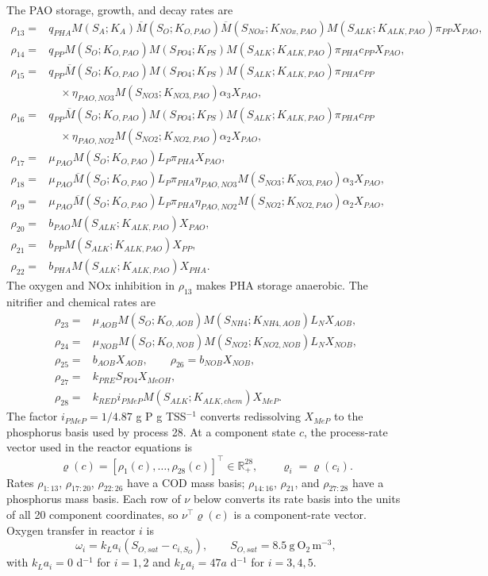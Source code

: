 \documentclass[a4paper,fleqn]{cas-sc}
\newcommand{\R}{\mathbb{R}}
\begin{document}
The PAO storage, growth, and decay rates are
\begin{align}
\rho_{13}={}&q_{PHA}M(S_A;K_A)\overline M(S_O;K_{O,PAO})\overline M(S_{NOx};K_{NOx,PAO})M(S_{ALK};K_{ALK,PAO})\pi_{PP}X_{PAO},\\
\rho_{14}={}&q_{PP}M(S_O;K_{O,PAO})M(S_{PO4};K_{PS})M(S_{ALK};K_{ALK,PAO})\pi_{PHA}c_{PP}X_{PAO},\\
\rho_{15}={}&q_{PP}\overline M(S_O;K_{O,PAO})M(S_{PO4};K_{PS})M(S_{ALK};K_{ALK,PAO})\pi_{PHA}c_{PP}\\
&\quad\times\eta_{PAO,NO3}M(S_{NO3};K_{NO3,PAO})\alpha_3X_{PAO},\\
\rho_{16}={}&q_{PP}\overline M(S_O;K_{O,PAO})M(S_{PO4};K_{PS})M(S_{ALK};K_{ALK,PAO})\pi_{PHA}c_{PP}\\
&\quad\times\eta_{PAO,NO2}M(S_{NO2};K_{NO2,PAO})\alpha_2X_{PAO},\\
\rho_{17}={}&\mu_{PAO}M(S_O;K_{O,PAO})L_P\pi_{PHA}X_{PAO},\\
\rho_{18}={}&\mu_{PAO}\overline M(S_O;K_{O,PAO})L_P\pi_{PHA}\eta_{PAO,NO3}M(S_{NO3};K_{NO3,PAO})\alpha_3X_{PAO},\\
\rho_{19}={}&\mu_{PAO}\overline M(S_O;K_{O,PAO})L_P\pi_{PHA}\eta_{PAO,NO2}M(S_{NO2};K_{NO2,PAO})\alpha_2X_{PAO},\\
\rho_{20}={}&b_{PAO}M(S_{ALK};K_{ALK,PAO})X_{PAO},\\
\rho_{21}={}&b_{PP}M(S_{ALK};K_{ALK,PAO})X_{PP},\\
\rho_{22}={}&b_{PHA}M(S_{ALK};K_{ALK,PAO})X_{PHA}.
\end{align}
The oxygen and NOx inhibition in $\rho_{13}$ makes PHA storage anaerobic. The nitrifier and chemical rates are
\begin{align}
\rho_{23}={}&\mu_{AOB}M(S_O;K_{O,AOB})M(S_{NH4};K_{NH4,AOB})L_NX_{AOB},\\
\rho_{24}={}&\mu_{NOB}M(S_O;K_{O,NOB})M(S_{NO2};K_{NO2,NOB})L_NX_{NOB},\\
\rho_{25}={}&b_{AOB}X_{AOB},\qquad \rho_{26}=b_{NOB}X_{NOB},\\
\rho_{27}={}&k_{PRE}S_{PO4}X_{MeOH},\\
\rho_{28}={}&k_{RED}i_{PMeP}M(S_{ALK};K_{ALK,chem})X_{MeP}.
\end{align}
The factor $i_{PMeP}=1/4.87$ g P g TSS$^{-1}$ converts redissolving $X_{MeP}$ to the phosphorus basis used by process 28. At a component state $c$, the process-rate vector used in the reactor equations is
\begin{equation}
\varrho(c)=[\rho_1(c),\ldots,\rho_{28}(c)]^\top\in\R_+^{28},
\qquad \varrho_i=\varrho(c_i).
\end{equation}
Rates $\rho_{1:13}$, $\rho_{17:20}$, $\rho_{22:26}$ have a COD mass basis; $\rho_{14:16}$, $\rho_{21}$, and $\rho_{27:28}$ have a phosphorus mass basis. Each row of $\nu$ below converts its rate basis into the units of all 20 component coordinates, so $\nu^\top\varrho(c)$ is a component-rate vector.
Oxygen transfer in reactor $i$ is
\begin{equation}
\omega_i=k_La_i(S_{O,sat}-c_{i,S_O}),\qquad S_{O,sat}=8.5\ \mathrm{g\ O_2\,m^{-3}},
\end{equation}
with $k_La_i=0$ d$^{-1}$ for $i=1,2$ and $k_La_i=47a$ d$^{-1}$ for $i=3,4,5$.
\end{document}
